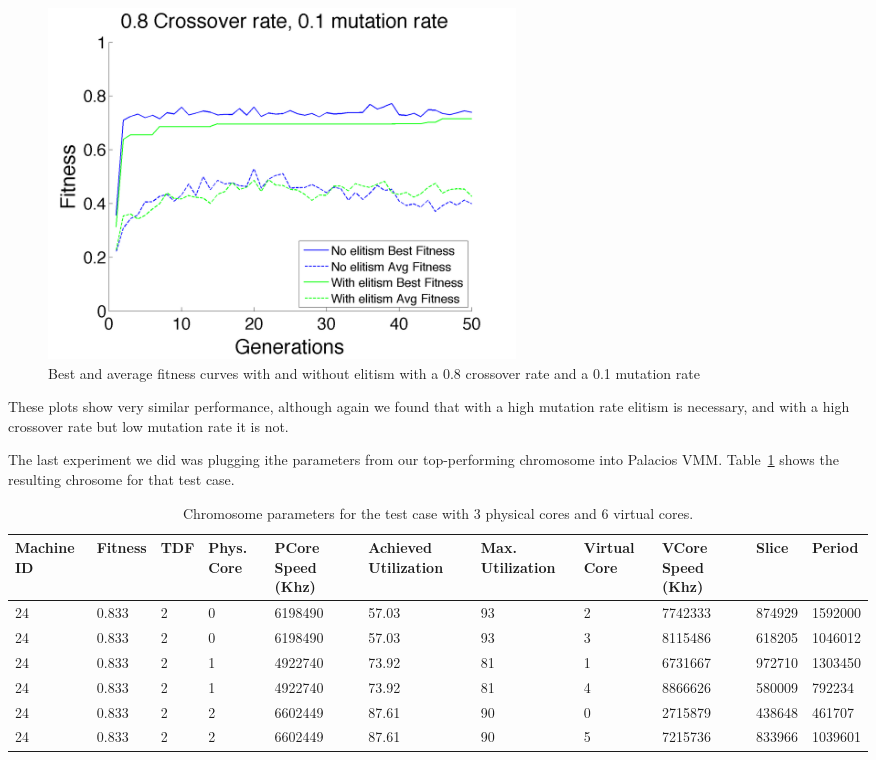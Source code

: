 \documentclass[11pt]{article}
\begin{document}
\begin{figure}[H]
 \centering
  \includegraphics[width=0.6\textwidth,height=0.2\textheight]{figures/fitness01mut08cross.png}
  \caption{Best and average fitness curves with and without elitism with a 0.8 crossover rate and a 0.1 mutation rate}
  \label{fig:fig6}  
\end{figure}

These plots show very similar performance, although again we found that with a high mutation rate elitism is necessary, and with a high crossover rate but low mutation rate it is not.

The last experiment we did was plugging ithe parameters from our top-performing chromosome into Palacios VMM. Table~\ref{tab:table1} shows the resulting chrosome for that test case.

\begin{table}[H]
\centering
\begin{footnotesize}
\renewcommand{\arraystretch}{1.2}

 \begin{tabularx}{17cm}{ | X | X | X | X | X | X | X | X | X | X | X |}
 \hline
Machine ID & Fitness & TDF  & Phys. Core & PCore Speed (Khz) & Achieved Utilization & Max. Utilization & Virtual Core& VCore Speed (Khz) & Slice & Period \\ \hline

24 & 0.833 & 2 & 0 & 6198490 & 57.03 & 93 & 2 & 7742333 & 874929 & 1592000 \\ \hline
24 & 0.833 & 2 & 0 & 6198490 & 57.03 & 93 & 3 & 8115486 & 618205 & 1046012 \\ \hline

24 & 0.833 & 2 & 1 & 4922740 & 73.92 & 81 & 1 & 6731667 & 972710 & 1303450 \\ \hline
24 & 0.833 & 2 & 1 & 4922740 & 73.92 & 81 & 4 & 8866626 & 580009 & 792234 \\ \hline

24 & 0.833 & 2 & 2 & 6602449 & 87.61 & 90 & 0 & 2715879 & 438648 & 461707 \\ \hline
24 & 0.833 & 2 & 2 & 6602449 & 87.61 & 90 & 5 & 7215736 & 833966 & 1039601 \\ \hline

\end{tabularx}
\caption{Chromosome parameters for the test case with 3 physical cores and 6 virtual cores.} \label{tab:table1}
\end{footnotesize}
\end{table}
\end{document}
